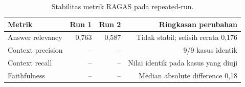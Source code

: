 \begin{table}[!htbp]
\centering
\caption{Stabilitas metrik RAGAS pada repeated-run.}
\label{tab:tab6.13_stabilitas_ragas}
    \begin{tabular}{lrrr}
    \hline
    \textbf{Metrik} & \textbf{Run 1} & \textbf{Run 2} & \textbf{Ringkasan perubahan} \\
    \hline
    Answer relevancy & 0,763 & 0,587 & Tidak stabil; selisih rerata 0,176 \\
    Context precision & -- & -- & 9/9 kasus identik \\
    Context recall & -- & -- & Nilai identik pada kasus yang diuji \\
    Faithfulness & -- & -- & Median absolute difference 0,18 \\
    \hline
    \end{tabular}
\end{table}